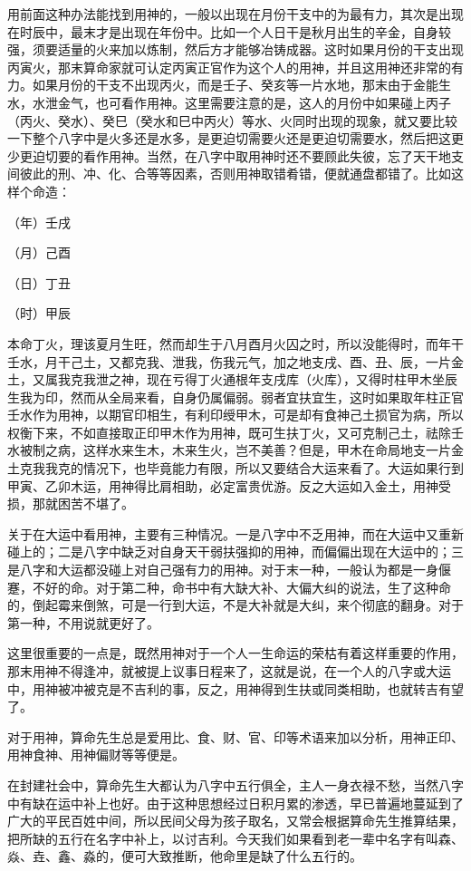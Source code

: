 \documentclass[a5paper,oneside,12pt]{ctexbook}
\begin{document}
用前面这种办法能找到用神的，一般以出现在月份干支中的为最有力，其次是出现在时辰中，最末才是出现在年份中。比如一个人日干是秋月出生的辛金，自身较强，须要适量的火来加以炼制，然后方才能够冶铸成器。这时如果月份的干支出现丙寅火，那末算命家就可认定丙寅正官作为这个人的用神，并且这用神还非常的有力。如果月份的干支不出现丙火，而是壬子、癸亥等一片水地，那末由于金能生水，水泄金气，也可看作用神。这里需要注意的是，这人的月份中如果碰上丙子（丙火、癸水）、癸巳（癸水和巳中丙火）等水、火同时出现的现象，就又要比较一下整个八字中是火多还是水多，是更迫切需要火还是更迫切需要水，然后把这更少更迫切要的看作用神。当然，在八字中取用神时还不要顾此失彼，忘了天干地支间彼此的刑、冲、化、合等等因素，否则用神取错肴错，便就通盘都错了。比如这样个命造：

（年）壬戌\par
（月）己酉\par
（日）丁丑\par
（时）甲辰

本命丁火，理该夏月生旺，然而却生于八月酉月火囚之时，所以没能得时，而年干壬水，月干己土，又都克我、泄我，伤我元气，加之地支戌、酉、丑、辰，一片金土，又属我克我泄之神，现在亏得丁火通根年支戌库（火库），又得时柱甲木坐辰生我为印，然而从全局来看，自身仍属偏弱。弱者宜扶宜生，这时如果取年柱正官壬水作为用神，以期官印相生，有利印绶甲木，可是却有食神己土损官为病，所以权衡下来，不如直接取正印甲木作为用神，既可生扶丁火，又可克制己土，祛除壬水被制之病，这样水来生木，木来生火，岂不美善？但是，甲木在命局地支一片金土克我我克的情况下，也毕竟能力有限，所以又要结合大运来看了。大运如果行到甲寅、乙卯木运，用神得比肩相助，必定富贵优游。反之大运如入金土，用神受损，那就困苦不堪了。

关于在大运中看用神，主要有三种情况。一是八字中不乏用神，而在大运中又重新碰上的；二是八字中缺乏对自身天干弱扶强抑的用神，而偏偏出现在大运中的；三是八字和大运都没碰上对自己强有力的用神。对于末一种，一般认为都是一身偃蹇，不好的命。对于第二种，命书中有大缺大补、大偏大纠的说法，生了这种命的，倒起霉来倒煞，可是一行到大运，不是大补就是大纠，来个彻底的翻身。对于第一种，不用说就更好了。

这里很重要的一点是，既然用神对于一个人一生命运的荣枯有着这样重要的作用，那末用神不得逢冲，就被提上议事日程来了，这就是说，在一个人的八字或大运中，用神被冲被克是不吉利的事，反之，用神得到生扶或同类相助，也就转吉有望了。

对于用神，算命先生总是爱用比、食、财、官、印等术语来加以分析，用神正印、用神食神、用神偏财等等便是。

在封建社会中，算命先生大都认为八字中五行俱全，主人一身衣禄不愁，当然八字中有缺在运中补上也好。由于这种思想经过日积月累的渗透，早已普遍地蔓延到了广大的平民百姓中间，所以民间父母为孩子取名，又常会根据算命先生推算结果，把所缺的五行在名字中补上，以讨吉利。今天我们如果看到老一辈中名字有叫森、焱、垚、鑫、淼的，便可大致推断，他命里是缺了什么五行的。
\end{document}
